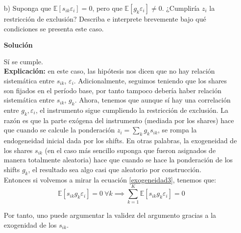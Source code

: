 \documentclass[a4paper, answers, addpoints, 11pt]{exam}
\newenvironment{solucion}{%
  \begin{mdframed}[
    backgroundcolor=blue!5,    %
    linecolor=blue!50,          %
    linewidth=2pt,              %
    leftmargin=10pt,            %
    rightmargin=8pt,           %
    topline=true,              %
    bottomline=true,            %
    roundcorner=10pt,           %
    innerleftmargin=10pt,       %
    innerrightmargin=10pt,      %
    innerbottommargin=10pt,     %
    innertopmargin=10pt         %
  ]%
  \begin{tcolorbox}[colframe=blue!50!black, colback=blue!50, coltitle=white, sharp corners=all, boxrule=1mm, width=\textwidth, halign=left, valign=center, top=0mm, bottom=0mm, left=0mm, right=0mm] \textbf{Solución} \end{tcolorbox} }{\end{mdframed}}
\begin{document}
\begin{enumerate}
\begin{itemize}
\begin{solucion}
\textbf{Interpretación:}\noindent En el escenario ideal del caso (a), ni la estructura industrial preexistente de la región ($s_{ik}$) ni los choques nacionales de importaciones ($g_k$) están correlacionados con otros factores no observados que afectan el crecimiento del empleo regional ($\varepsilon_i$). En otras palabras, la exposición de la región al 'China shock'  a través de $z_i$ es independiente de cualquier otra variable no medida que influya en el resultado ($y_i$). Esto permitiría usar $z_i$ como un instrumento apropiado para estimar el efecto causal del cambio en las importaciones chinas ($x_i$) sobre el crecimiento del empleo regional ($y_i$).


\end{solucion}
        \item[b)] Suponga que $\mathbb{E}[s_{ik}\varepsilon_i] = 0$, pero que $\mathbb{E}[g_k\varepsilon_i] \neq 0$. ¿Cumpliría $z_i$ la restricción de exclusión? Describa e interprete brevemente bajo qué condiciones se presenta este caso.
        \begin{solucion}
         Sí se cumple.\\
         
        \textbf{Explicación:} en este caso, las hipótesis  nos dicen que no hay relación sistemática entre \(s_{ik}\), \(\varepsilon_i\). Adicionalmente, seguimos teniendo que los shares son fijados en el período base, por tanto tampoco debería haber relación sistemática entre \(s_{ik}\), \(g_k\). Ahora, tenemos que aunque sí hay una correlación entre $g_k, \varepsilon_i$, el instrumento sigue cumpliendo la restricción de exclusión. La razón es que la parte exógena del instrumento (mediada por los shares) hace que cuando se calcule la ponderación $z_i=\sum_k g_k s_{ik}$, se rompa la endogeneidad inicial dada por los shifts. En otras palabras, la exogeneidad de los shares $s_{ik}$ (en el caso más sencillo suponga que fueron asignados de manera totalmente aleatoria) hace que cuando se hace la ponderación de los shifts $g_k$, el resultado sea algo casi que aleatorio por construcción. \\
        
        Entonces si volvemos a mirar la ecuación \ref{exogeneidad3}, tenemos que:
     \[\mathbb{E}[s_{ik} g_k \varepsilon_i] =
 0 \: \forall k \implies   \sum_{k=1}^K \mathbb{E}[s_{ik} g_k \varepsilon_i]=0
\] 
        
Por tanto, uno puede argumentar la validez del argumento gracias a la exogenidad de los $s_{ik}$.\\
        

\end{solucion}
\end{itemize}
\end{enumerate}
\end{document}
